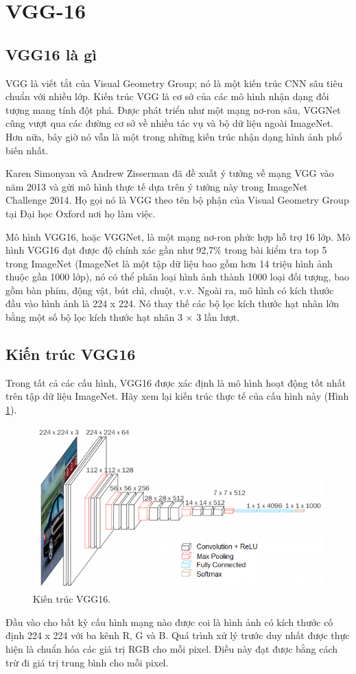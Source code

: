 \section{VGG-16}
\subsection{VGG16 là gì}
VGG là viết tắt của Visual Geometry Group; nó là một kiến trúc CNN sâu tiêu chuẩn với nhiều lớp. Kiến trúc VGG là cơ sở của các mô hình nhận dạng đối tượng mang tính đột phá. Được phát triển như một mạng nơ-ron sâu, VGGNet cũng vượt qua các đường cơ sở về nhiều tác vụ và bộ dữ liệu ngoài ImageNet. Hơn nữa, bây giờ nó vẫn là một trong những kiến trúc nhận dạng hình ảnh phổ biến nhất.

Karen Simonyan và Andrew Zisserman \cite{vgg16} đã đề xuất ý tưởng về mạng VGG vào năm 2013 và gửi mô hình thực tế dựa trên ý tưởng này trong ImageNet Challenge 2014. Họ gọi nó là VGG theo tên bộ phận của Visual Geometry Group tại Đại học Oxford nơi họ làm việc.

Mô hình VGG16, hoặc VGGNet, là một mạng nơ-ron phức hợp hỗ trợ 16 lớp. Mô hình VGG16 đạt được độ chính xác gần như 92,7\% trong bài kiểm tra top 5 trong ImageNet (ImageNet là một tập dữ liệu bao gồm hơn 14 triệu hình ảnh thuộc gần 1000 lớp), nó có thể phân loại hình ảnh thành 1000 loại đối tượng, bao gồm bàn phím, động vật, bút chì, chuột, v.v. Ngoài ra, mô hình có kích thước đầu vào hình ảnh là 224 x 224. Nó thay thế các bộ lọc kích thước hạt nhân lớn bằng một số bộ lọc kích thước hạt nhân 3 × 3 lần lượt.

\subsection{Kiến trúc VGG16}
Trong tất cả các cấu hình, VGG16 được xác định là mô hình hoạt động tốt nhất trên tập dữ liệu ImageNet. Hãy xem lại kiến trúc thực tế của cấu hình này (Hình \ref{fig:vgg16_imagenet}).
\begin{figure}[H]
	\centering
	\includegraphics[width=0.6\linewidth]{images/vgg16_imagenet}
	\caption{Kiến trúc VGG16.}
	\label{fig:vgg16_imagenet}
\end{figure}
Đầu vào cho bất kỳ cấu hình mạng nào được coi là hình ảnh có kích thước cố định 224 x 224 với ba kênh R, G và B. Quá trình xử lý trước duy nhất được thực hiện là chuẩn hóa các giá trị RGB cho mỗi pixel. Điều này đạt được bằng cách trừ đi giá trị trung bình cho mỗi pixel.

